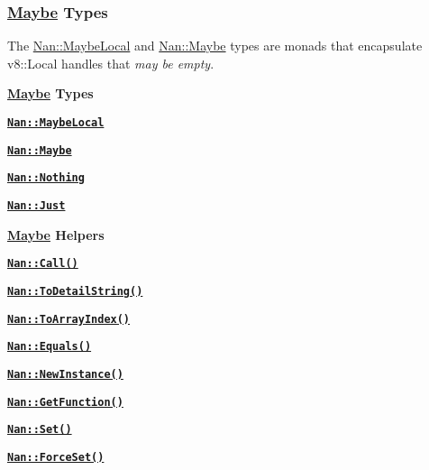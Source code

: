\subsubsection*{\hyperlink{class_maybe}{Maybe} Types}

The {\ttfamily \hyperlink{class_nan_1_1_maybe_local}{Nan\+::\+Maybe\+Local}} and {\ttfamily \hyperlink{class_nan_1_1_maybe}{Nan\+::\+Maybe}} types are monads that encapsulate {\ttfamily v8\+::\+Local} handles that {\itshape may be empty}.


\begin{DoxyItemize}
\item {\bfseries \hyperlink{class_maybe}{Maybe} Types}
\begin{DoxyItemize}
\item \href{doc/maybe_types.md#api_nan_maybe_local}{\tt {\bfseries {\ttfamily Nan\+::\+Maybe\+Local}}}
\item \href{doc/maybe_types.md#api_nan_maybe}{\tt {\bfseries {\ttfamily Nan\+::\+Maybe}}}
\item \href{doc/maybe_types.md#api_nan_nothing}{\tt {\bfseries {\ttfamily Nan\+::\+Nothing}}}
\item \href{doc/maybe_types.md#api_nan_just}{\tt {\bfseries {\ttfamily Nan\+::\+Just}}}
\end{DoxyItemize}
\item {\bfseries \hyperlink{class_maybe}{Maybe} Helpers}
\begin{DoxyItemize}
\item \href{doc/maybe_types.md#api_nan_call}{\tt {\bfseries {\ttfamily Nan\+::\+Call()}}}
\item \href{doc/maybe_types.md#api_nan_to_detail_string}{\tt {\bfseries {\ttfamily Nan\+::\+To\+Detail\+String()}}}
\item \href{doc/maybe_types.md#api_nan_to_array_index}{\tt {\bfseries {\ttfamily Nan\+::\+To\+Array\+Index()}}}
\item \href{doc/maybe_types.md#api_nan_equals}{\tt {\bfseries {\ttfamily Nan\+::\+Equals()}}}
\item \href{doc/maybe_types.md#api_nan_new_instance}{\tt {\bfseries {\ttfamily Nan\+::\+New\+Instance()}}}
\item \href{doc/maybe_types.md#api_nan_get_function}{\tt {\bfseries {\ttfamily Nan\+::\+Get\+Function()}}}
\item \href{doc/maybe_types.md#api_nan_set}{\tt {\bfseries {\ttfamily Nan\+::\+Set()}}}
\item \href{doc/maybe_types.md#api_nan_force_set}{\tt {\bfseries {\ttfamily Nan\+::\+Force\+Set()}}}

\end{DoxyItemize}
\end{DoxyItemize}
